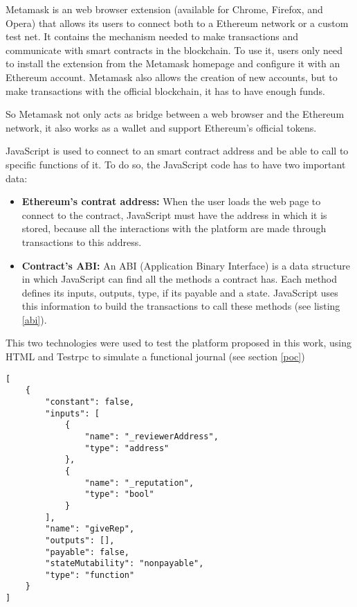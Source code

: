 Metamask is an web browser extension (available for Chrome, Firefox, and Opera)
that allows its users to connect both to a Ethereum network or a custom test
net. It contains the mechanism needed to make transactions and communicate with
smart contracts in the blockchain. To use it, users only need to install the
extension from the Metamask homepage and configure it with an Ethereum account.
Metamask also allows the creation of new accounts, but to make transactions with
the official blockchain, it has to have enough funds.

So Metamask not only acts as bridge between a web browser and the Ethereum
network, it also works as a wallet and support Ethereum's official tokens.

JavaScript is used to connect to an smart contract address and be able to call
to specific functions of it. To do so, the JavaScript code has to have two
important data:

\begin{itemize}
\item \textbf{Ethereum's contrat address:} When the user loads the web page to
  connect to the contract, JavaScript must have the address in which it is
  stored, because all the interactions with the platform are made through
  transactions to this address.
\item \textbf{Contract's ABI:} An ABI (Application Binary Interface) is a data
  structure in which JavaScript can find all the methods a contract has. Each
  method defines its inputs, outputs, type, if its payable and a state.
  JavaScript uses this information to build the transactions to call
  these methods (see listing \ref{abi}).

\end{itemize}

This two technologies were used to test the platform proposed in this work,
using HTML and Testrpc to simulate a functional journal (see
section \ref{poc})
\newpage
\begin{lstlisting}[frame=single,caption=ABI fragment example,label=abi]
[
	{
		"constant": false,
		"inputs": [
			{
				"name": "_reviewerAddress",
				"type": "address"
			},
			{
				"name": "_reputation",
				"type": "bool"
			}
		],
		"name": "giveRep",
		"outputs": [],
		"payable": false,
		"stateMutability": "nonpayable",
		"type": "function"
	}
]
\end{lstlisting}

